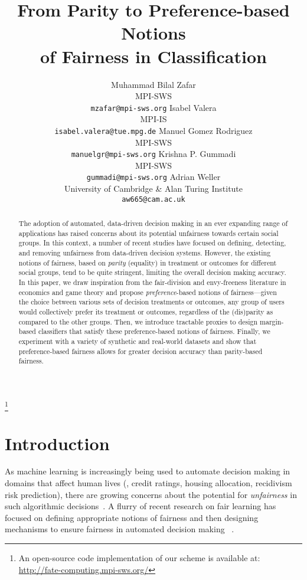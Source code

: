 \documentclass{article}
\title{
From Parity to Preference-based Notions \\of Fairness in Classification
  }
\author{
  Muhammad Bilal Zafar \\
  MPI-SWS \\
  \texttt{mzafar@mpi-sws.org}
  \And
  Isabel Valera \\
  MPI-IS\\
  \texttt{isabel.valera@tue.mpg.de}
  \And
  Manuel Gomez Rodriguez\\
  MPI-SWS\\
  \texttt{manuelgr@mpi-sws.org}
  \And
  Krishna P. Gummadi \\
  MPI-SWS \\
  \texttt{gummadi@mpi-sws.org}
  \And
  Adrian Weller\\
  University of Cambridge \& Alan Turing Institute\\
  \texttt{aw665@cam.ac.uk}
}
\newcommand\nonumfootnote[1]{
  \begingroup
  \renewcommand\thefootnote{}\footnote{#1}
  \addtocounter{footnote}{-1}
  \endgroup
}
\begin{document}
\maketitle

\nonumfootnote
{
An open-source code implementation of our scheme is available at: \href{http://fate-computing.mpi-sws.org/}{http://fate-computing.mpi-sws.org/}
}

\begin{abstract}
The adoption of automated, data-driven decision making in an ever
expanding range of applications has raised concerns about its
potential unfairness towards certain social groups. In this context, a
number of recent studies have focused on defining, detecting, and
removing unfairness from data-driven decision systems. However, the
existing notions of fairness, based on \emph{parity} (equality) in
treatment or outcomes for different social groups, tend to be
quite
stringent, limiting the overall decision making accuracy.
In this paper, we draw inspiration from the fair-division and
envy-freeness literature in economics and game theory and propose
\emph{preference}-based notions of fairness---given the choice between
various sets of decision treatments or outcomes, any group of users
would collectively prefer its treatment or outcomes, regardless of the
(dis)parity as compared to the other groups.
Then, we introduce tractable proxies to design
margin-based classifiers that satisfy these preference-based notions of fairness.
Finally, we experiment with a variety of synthetic and real-world
datasets and show that preference-based fairness allows for
greater decision accuracy than parity-based fairness.

\end{abstract}


\section {Introduction}\label{sec:intro}
As machine learning is increasingly being used to automate decision making in domains that affect human lives (\eg, credit ratings,
housing allocation, recidivism risk prediction), there are growing concerns about the potential for {\it unfairness} in such algorithmic
decisions~\cite{propublica_compas, bigdatawhitehouse2016}. A flurry of recent research on fair learning has focused on defining
appropriate notions of fairness and then designing mechanisms to ensure fairness in automated decision making
~\cite{Dwork2012,feldman_kdd15, hardt_nips16, joseph_bandits, kamiran_sampling, kamishima_regularizer,pedreschi_discrimination, zafar_dmt, zafar_fairness, icml2013_zemel13}.
\end{document}
